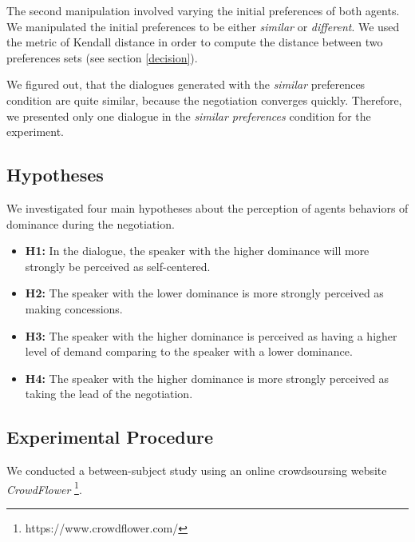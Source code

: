 \documentclass{llncs}
\begin{document}
		The second manipulation involved varying the initial preferences of both agents. We manipulated the initial preferences to be either \textit{similar} or \textit{different}. We used the metric of Kendall distance \cite{bra2013Kendall} in order to compute the distance between two preferences sets (see section \ref{decision}).  
		
		
		We figured out, that the dialogues generated with the \textit{similar} preferences condition are quite similar, because the negotiation converges quickly. Therefore, we presented only one dialogue in the \textit{similar preferences} condition for the experiment. 
		
		
				
		\subsection{Hypotheses}
		 We investigated four main hypotheses about the perception of agents behaviors of dominance during the negotiation. 
		 \begin{itemize}
		 	\item  \textbf{H1:} In the dialogue, the speaker with the higher dominance will more strongly be perceived as self-centered.  
		 	
		 	\item \textbf{H2:} The speaker with the lower dominance is more strongly perceived as making concessions.
		 	
		 	\item \textbf{H3:} The speaker with the higher dominance is perceived as having a higher level of demand comparing to the speaker with a lower dominance.
		 	
		 	\item \textbf{H4:} The speaker with the higher dominance is more strongly perceived as taking the lead of the negotiation.
		 	
		 \end{itemize}
				
		\subsection{Experimental Procedure}
		
		We conducted a between-subject study using an online crowdsoursing website \emph{CrowdFlower} \footnote{https://www.crowdflower.com/}. 
		
		
\end{document}
